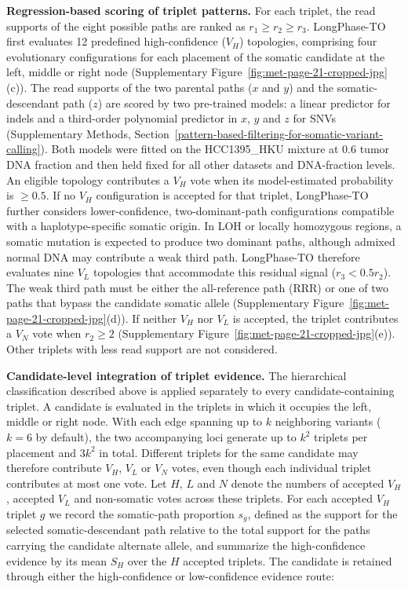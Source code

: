 \documentclass[unnumsec,webpdf,contemporary,large]{oup-authoring-template}
\begin{document}
\noindent\textbf{Regression-based scoring of triplet patterns.} For each triplet, the read supports of the eight possible paths are ranked as \(r_1\geq r_2\geq r_3\). LongPhase-TO first evaluates 12 predefined high-confidence (\(V_H\)) topologies, comprising four evolutionary configurations for each placement of the somatic candidate at the left, middle or right node (Supplementary Figure~\ref{fig:met-page-21-cropped-jpg}(c)). The read supports of the two parental paths (\(x\) and \(y\)) and the somatic-descendant path (\(z\)) are scored by two pre-trained models: a linear predictor for indels and a third-order polynomial predictor in \(x\), \(y\) and \(z\) for SNVs (Supplementary Methods, Section~\ref{pattern-based-filtering-for-somatic-variant-calling}). Both models were fitted on the HCC1395\_HKU mixture at 0.6 tumor DNA fraction and then held fixed for all other datasets and DNA-fraction levels. An eligible topology contributes a \(V_H\) vote when its model-estimated probability is \(\geq0.5\).
If no \(V_H\) configuration is accepted for that triplet, LongPhase-TO further considers lower-confidence, two-dominant-path configurations compatible with a haplotype-specific somatic origin. In LOH or locally homozygous regions, a somatic mutation is expected to produce two dominant paths, although admixed normal DNA may contribute a weak third path. LongPhase-TO therefore evaluates nine \(V_L\) topologies that accommodate this residual signal (\(r_3<0.5r_2\)).
The weak third path must be either the all-reference path (RRR) or one of two paths that bypass the candidate somatic allele (Supplementary Figure~\ref{fig:met-page-21-cropped-jpg}(d)). If neither \(V_H\) nor \(V_L\) is accepted, the triplet contributes a \(V_N\) vote when \(r_2\geq2\) (Supplementary Figure~\ref{fig:met-page-21-cropped-jpg}(e)). Other triplets with less read support are not considered.

\noindent\textbf{Candidate-level integration of triplet evidence.} The hierarchical classification described above is applied separately to every candidate-containing triplet. A candidate is evaluated in the triplets in which it occupies the left, middle or right node. With each edge spanning up to \(k\) neighboring variants (\(k=6\) by default), the two accompanying loci generate up to \(k^2\) triplets per placement and \(3k^2\) in total. Different triplets for the same candidate may therefore contribute \(V_H\), \(V_L\) or \(V_N\) votes, even though each individual triplet contributes at most one vote. Let \(H\), \(L\) and \(N\) denote the numbers of accepted \(V_H\), accepted \(V_L\) and non-somatic votes across these triplets. For each accepted \(V_H\) triplet \(g\) we record the somatic-path proportion \(s_g\), defined as the support for the selected somatic-descendant path relative to the total support for the paths carrying the candidate alternate allele, and summarize the high-confidence evidence by its mean \(S_H\) over the \(H\) accepted triplets. The candidate is retained through either the high-confidence or low-confidence evidence route:
\end{document}
